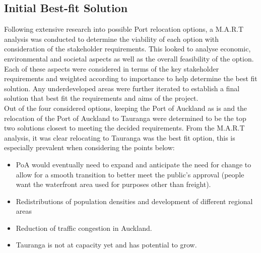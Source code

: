 \newpage
{}
\vspace*{-40mm} %

\subsection*{Initial Best-fit Solution}
Following extensive research into possible Port relocation options, a M.A.R.T analysis was conducted to determine the viability of each option with consideration of the stakeholder requirements. This looked to analyse economic, environmental and societal aspects as well as the overall feasibility of the option. Each of these aspects were considered in terms of the key stakeholder requirements and weighted according to importance to help determine the best fit solution. Any underdeveloped areas were further iterated to establish a final solution that best fit the requirements and aims of the project. 
\\Out of the four considered options, keeping the Port of Auckland as is and the relocation of the Port of Auckland to Tauranga were determined to be the top two solutions closest to meeting the decided requirements. From the M.A.R.T analysis, it was clear relocating to Tauranga was the best fit option, this is especially prevalent when considering the points below:
\begin{itemize}[noitemsep]
    \vspace{-2mm}
    \item PoA would eventually need to expand and anticipate the need for change to allow for a smooth transition to better meet the public's approval (people want the waterfront area used for purposes other than freight).
    \item Redistributions of population densities and development of different regional areas
    \item Reduction of traffic congestion in Auckland.
    \item Tauranga is not at capacity yet and has potential to grow.
\end{itemize}
